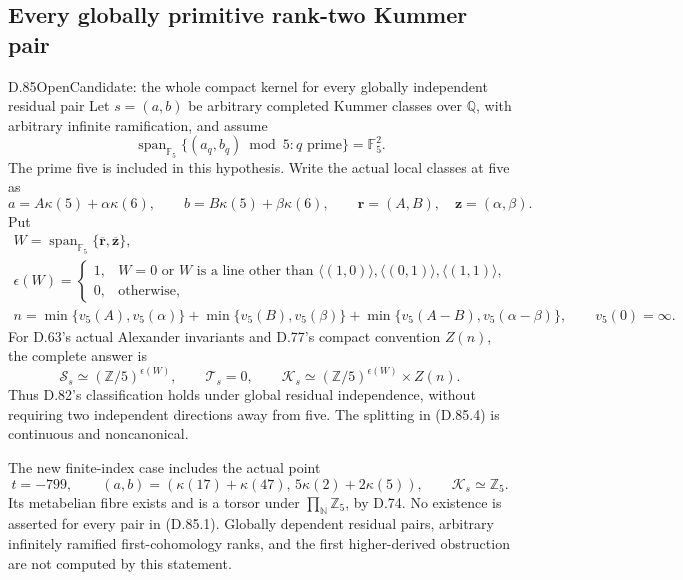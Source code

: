 \subsection{Every globally primitive rank-two Kummer pair}

\begin{statement}{D.85}{Open}{Candidate: the whole compact kernel for every globally independent residual pair}
Let \(s=(a,b)\) be arbitrary completed Kummer classes over
\(\mathbb Q\), with arbitrary infinite ramification, and assume
\[
 \operatorname{span}_{\mathbb F_5}
       \{(a_q,b_q)\bmod5:q\text{ prime}\}=\mathbb F_5^2.
                                                               \tag{D.85.1}
\]
The prime five is included in this hypothesis. Write the actual
local classes at five as
\[
 a=A\kappa(5)+\alpha\kappa(6),\qquad
 b=B\kappa(5)+\beta\kappa(6),
 \qquad \mathbf r=(A,B),\quad\mathbf z=(\alpha,\beta).
                                                               \tag{D.85.2}
\]
Put
\[
 \begin{gathered}
 W=\operatorname{span}_{\mathbb F_5}\{\overline{\mathbf r},
                                      \overline{\mathbf z}\},\\
 \epsilon(W)=
 \begin{cases}
 1,&W=0\text{ or }W\text{ is a line other than }
 \langle(1,0)\rangle,\langle(0,1)\rangle,\langle(1,1)\rangle,\\
 0,&\text{otherwise},
 \end{cases}\\
 n=\min\{v_5(A),v_5(\alpha)\}
  +\min\{v_5(B),v_5(\beta)\}
  +\min\{v_5(A-B),v_5(\alpha-\beta)\},\qquad v_5(0)=\infty.
 \end{gathered}                                                \tag{D.85.3}
\]
For D.63's actual Alexander invariants and D.77's compact
convention \(Z(n)\), the complete answer is
\[
 \mathcal S_s\simeq(\mathbb Z/5)^{\epsilon(W)},\qquad
 \mathcal T_s=0,\qquad
 \mathcal K_s\simeq(\mathbb Z/5)^{\epsilon(W)}\times Z(n).
                                                               \tag{D.85.4}
\]
Thus D.82's classification holds under global residual
independence, without requiring two independent directions
away from five. The splitting in (D.85.4) is continuous and
noncanonical.

The new finite-index case includes the actual point
\[
 t=-799,\qquad
 (a,b)=(\kappa(17)+\kappa(47),\,5\kappa(2)+2\kappa(5)),
 \qquad \mathcal K_s\simeq\mathbb Z_5.
                                                               \tag{D.85.5}
\]
Its metabelian fibre exists and is a torsor under
\(\prod_{\mathbb N}\mathbb Z_5\), by D.74. No existence is
asserted for every pair in (D.85.1). Globally dependent
residual pairs, arbitrary infinitely ramified first-cohomology
ranks, and the first higher-derived obstruction are not
computed by this statement.
\end{statement}

